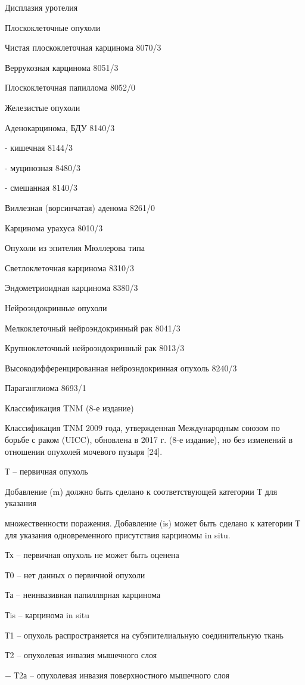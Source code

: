 Дисплазия уротелия

Плоскоклеточные опухоли

Чистая плоскоклеточная карцинома 8070/3

Веррукозная карцинома 8051/3

Плоскоклеточная папиллома 8052/0

Железистые опухоли

Аденокарцинома, БДУ 8140/3

- кишечная 8144/3

- муцинозная 8480/3

- смешанная 8140/3

Виллезная (ворсинчатая) аденома 8261/0

Карцинома урахуса 8010/3

Опухоли из эпителия Мюллерова типа

Светлоклеточная карцинома 8310/3

Эндометриоидная карцинома 8380/3

Нейроэндокринные опухоли

Мелкоклеточный нейроэндокринный рак 8041/3

Крупноклеточный нейроэндокринный рак 8013/3

Высокодифференцированная нейроэндокринная опухоль 8240/3

Параганглиома 8693/1

Классификация TNM (8-е издание)

Классификация TNM 2009 года, утвержденная Международным союзом по борьбе с раком (UICC), обновлена в 2017 г. (8-е издание), но без изменений в отношении опухолей мочевого пузыря [24].

Т – первичная опухоль

Добавление (m) должно быть сделано к соответствующей категории Т для указания

множественности поражения. Добавление (is) может быть сделано к категории Т для указания одновременного присутствия карциномы in situ.

Тх – первичная опухоль не может быть оценена

Т0 – нет данных о первичной опухоли

Та – неинвазивная папиллярная карцинома

Тis – карцинома in situ

Т1 – опухоль распространяется на субэпителиальную соединительную ткань

Т2 – опухолевая инвазия мышечного слоя

− Т2а – опухолевая инвазия поверхностного мышечного слоя

